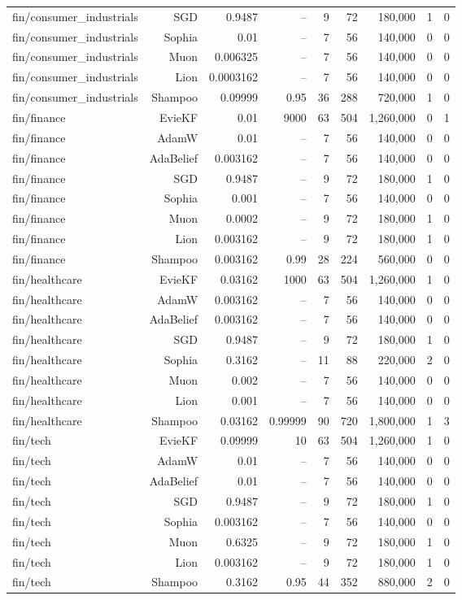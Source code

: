 \begin{table}[t]
\begin{tabular}{lrrrrrrrr}
fin/consumer\_industrials & SGD & 0.9487 & -- & 9 & 72 & 180,000 & 1 & 0 \\
fin/consumer\_industrials & Sophia & 0.01 & -- & 7 & 56 & 140,000 & 0 & 0 \\
fin/consumer\_industrials & Muon & 0.006325 & -- & 7 & 56 & 140,000 & 0 & 0 \\
fin/consumer\_industrials & Lion & 0.0003162 & -- & 7 & 56 & 140,000 & 0 & 0 \\
fin/consumer\_industrials & Shampoo & 0.09999 & 0.95 & 36 & 288 & 720,000 & 1 & 0 \\
fin/finance & EvieKF & 0.01 & 9000 & 63 & 504 & 1,260,000 & 0 & 1 \\
fin/finance & AdamW & 0.01 & -- & 7 & 56 & 140,000 & 0 & 0 \\
fin/finance & AdaBelief & 0.003162 & -- & 7 & 56 & 140,000 & 0 & 0 \\
fin/finance & SGD & 0.9487 & -- & 9 & 72 & 180,000 & 1 & 0 \\
fin/finance & Sophia & 0.001 & -- & 7 & 56 & 140,000 & 0 & 0 \\
fin/finance & Muon & 0.0002 & -- & 9 & 72 & 180,000 & 1 & 0 \\
fin/finance & Lion & 0.003162 & -- & 9 & 72 & 180,000 & 1 & 0 \\
fin/finance & Shampoo & 0.003162 & 0.99 & 28 & 224 & 560,000 & 0 & 0 \\
fin/healthcare & EvieKF & 0.03162 & 1000 & 63 & 504 & 1,260,000 & 1 & 0 \\
fin/healthcare & AdamW & 0.003162 & -- & 7 & 56 & 140,000 & 0 & 0 \\
fin/healthcare & AdaBelief & 0.003162 & -- & 7 & 56 & 140,000 & 0 & 0 \\
fin/healthcare & SGD & 0.9487 & -- & 9 & 72 & 180,000 & 1 & 0 \\
fin/healthcare & Sophia & 0.3162 & -- & 11 & 88 & 220,000 & 2 & 0 \\
fin/healthcare & Muon & 0.002 & -- & 7 & 56 & 140,000 & 0 & 0 \\
fin/healthcare & Lion & 0.001 & -- & 7 & 56 & 140,000 & 0 & 0 \\
fin/healthcare & Shampoo & 0.03162 & 0.99999 & 90 & 720 & 1,800,000 & 1 & 3 \\
fin/tech & EvieKF & 0.09999 & 10 & 63 & 504 & 1,260,000 & 1 & 0 \\
fin/tech & AdamW & 0.01 & -- & 7 & 56 & 140,000 & 0 & 0 \\
fin/tech & AdaBelief & 0.01 & -- & 7 & 56 & 140,000 & 0 & 0 \\
fin/tech & SGD & 0.9487 & -- & 9 & 72 & 180,000 & 1 & 0 \\
fin/tech & Sophia & 0.003162 & -- & 7 & 56 & 140,000 & 0 & 0 \\
fin/tech & Muon & 0.6325 & -- & 9 & 72 & 180,000 & 1 & 0 \\
fin/tech & Lion & 0.003162 & -- & 9 & 72 & 180,000 & 1 & 0 \\
fin/tech & Shampoo & 0.3162 & 0.95 & 44 & 352 & 880,000 & 2 & 0 \\
\bottomrule
\end{tabular}
\end{table}
